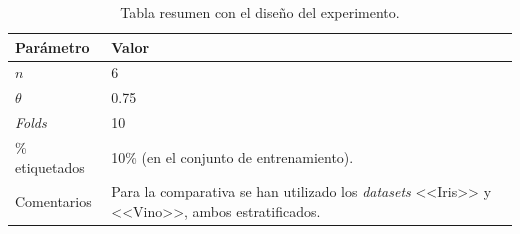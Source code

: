 \begin{table}
	\begin{centering}
		\begin{tabular}{@{}p{10em} p{20em} @{}}
			\toprule
			\textbf{Parámetro} & \textbf{Valor} \\ 
			\midrule
			$n$ & 6\\
			$\theta$ & 0.75 \\
			\textit{Folds} & 10 \\
			\% etiquetados & 10\% (en el conjunto de entrenamiento). \\
			Comentarios & Para la comparativa se han utilizado los \textit{datasets} <<Iris>> y <<Vino>>, ambos estratificados.\\
			\bottomrule
			
		\end{tabular}
	\end{centering}
	\caption[\textit{Co-forest}: resumen del experimento]{Tabla resumen con el diseño del experimento.}
	\label{tabla_coforest_keelvsnuestro_diseño}	
\end{table}

